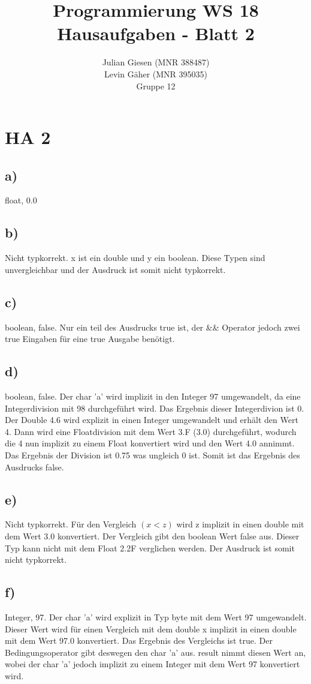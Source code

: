 \documentclass[a4paper]{article}
\title{ Programmierung WS 18 \\ Hausaufgaben - Blatt 2 }
\author{ Julian Giesen (MNR 388487) \\
Levin Gäher (MNR 395035) \\
Gruppe 12 }
\date{  }
\begin{document}
\maketitle

\section* { HA 2 }
\subsection*{ a) } 
float, 0.0
\subsection*{b)}
Nicht typkorrekt. x ist ein double und y ein boolean. Diese Typen sind unvergleichbar und der Ausdruck ist somit nicht typkorrekt.
\subsection*{c)}
boolean, false. Nur ein teil des Ausdrucks true ist, der \&\& Operator jedoch zwei true Eingaben für eine true Ausgabe benötigt.
\subsection*{d)}
boolean, false. Der char 'a' wird implizit in den Integer 97 umgewandelt, da eine Integerdivision mit 98 durchgeführt wird. Das Ergebnis dieser Integerdivion ist 0. Der Double 4.6 wird explizit in einen Integer umgewandelt und erhält den Wert 4. Dann wird eine Floatdivision mit dem Wert 3.F (3.0) durchgeführt, wodurch die 4 nun implizit zu einem Float konvertiert wird und den Wert 4.0 annimmt. Das Ergebnis der Division ist 0.75 was ungleich 0 ist. Somit ist das Ergebnis des Ausdrucks false. 
\subsection*{e)}
Nicht typkorrekt. Für den Vergleich $(x < z)$ wird z implizit in einen double mit dem Wert 3.0 konvertiert. Der Vergleich gibt den boolean Wert false aus. Dieser Typ kann nicht mit dem Float 2.2F verglichen werden. Der Ausdruck ist somit nicht typkorrekt.
\subsection*{f)}
Integer, 97. Der char 'a' wird explizit in Typ byte mit dem Wert 97 umgewandelt. Dieser Wert wird für einen Vergleich mit dem double x implizit in einen double mit dem Wert 97.0 konvertiert. Das Ergebnis des Vergleichs ist true. Der Bedingungsoperator gibt deswegen den char 'a' aus. result nimmt diesen Wert an, wobei der char 'a' jedoch implizit zu einem Integer mit dem Wert 97 konvertiert wird.
\end{document}
